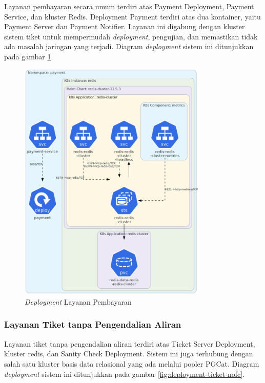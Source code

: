 Layanan pembayaran secara umum terdiri atas Payment Deployment, Payment Service, dan kluster Redis. Deployment Payment terdiri atas dua kontainer, yaitu Payment Server dan Payment Notifier. Layanan ini digabung dengan kluster sistem tiket untuk mempermudah \textit{deployment}, pengujian, dan memastikan tidak ada masalah jaringan yang terjadi. Diagram \textit{deployment} sistem ini ditunjukkan pada gambar \ref{fig:deployment-payment}.

\begin{figure}[htbp]
    \centering
    \includegraphics[width=0.8\textwidth]{resources/chapter-4/payment.png}
    \caption{\textit{Deployment} Layanan Pembayaran}
    \label{fig:deployment-payment}
\end{figure}


\pagebreak

\subsubsection{Layanan Tiket tanpa Pengendalian Aliran}

Layanan tiket tanpa pengendalian aliran terdiri atas Ticket Server Deployment, kluster redis, dan Sanity Check Deployment. Sistem ini juga terhubung dengan salah satu kluster basis data relasional yang ada melalui pooler PGCat. Diagram \textit{deployment} sistem ini ditunjukkan pada gambar \ref{fig:deployment-ticket-nofc}.

